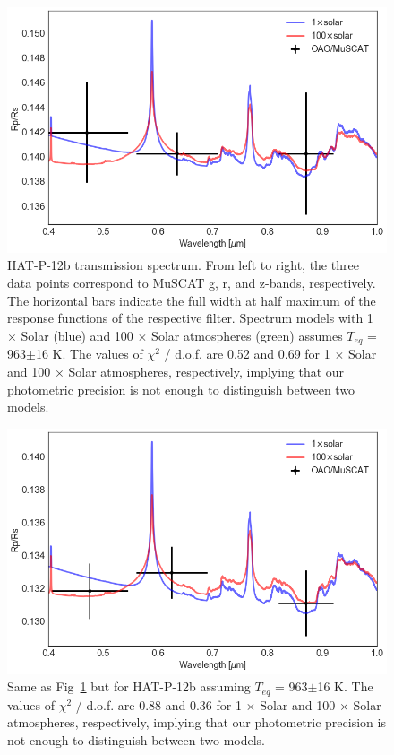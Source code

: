 \begin{figure}
\centering
\includegraphics[width=12cm]{hatp12/atm_model.png}
\caption{HAT-P-12b transmission spectrum. From left to right, the three data points %
correspond to MuSCAT g, r, and z-bands, respectively. The horizontal bars indicate the full width at half maximum of the response functions of the respective filter. Spectrum models with 1 $\times$ Solar (blue) and 100 $\times$ Solar atmospheres (green) assumes $T_{eq}$ = 963$\pm$16 K. 
 The values of $\chi^2$ / d.o.f. are 0.52 and 0.69 for 1 $\times$ Solar and 100 $\times$ Solar atmospheres, respectively, implying that our photometric precision is not enough to distinguish between two models.
 }
\label{fig:atm_hatp12b}
\end{figure}

\begin{figure}
\centering
\includegraphics[width=12cm]{hatp44/atm_model.png}
\caption{Same as Fig~\ref{fig:atm_hatp12b} but for HAT-P-12b assuming $T_{eq}$ = 963$\pm$16 K. 
The values of $\chi^2$ / d.o.f. are 0.88 and 0.36 for 1 $\times$ Solar and 100 $\times$ Solar atmospheres, respectively, implying that our photometric precision is not enough to distinguish between two models.}
\label{fig:atm_hatp44b}
\end{figure}

